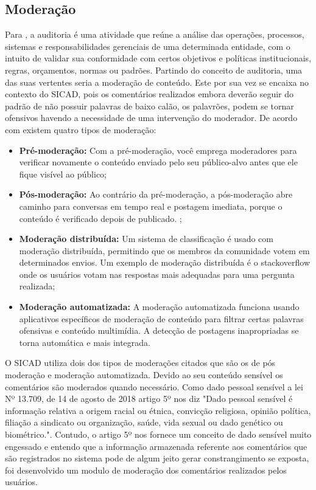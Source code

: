 \documentclass[12pt, a4paper]{report}
\begin{document}
\subsection{Moderação}
Para \citep{netosolanca2007}, a auditoria é uma atividade que reúne a análise das operações, processos, sistemas e responsabilidades gerenciais de uma determinada entidade, com o intuito de validar sua conformidade com certos objetivos e políticas institucionais, regras, orçamentos, normas ou padrões.
Partindo do conceito de auditoria, uma das suas vertentes seria a moderação de conteúdo. Este por sua vez se encaixa no contexto do SICAD, pois os comentários realizados embora deverão seguir do padrão de não possuir palavras de baixo calão, os palavrões, podem se tornar ofensivos havendo a necessidade de uma intervenção do moderador.
De acordo com \cite{SMITH2019} existem quatro tipos de moderação:
\begin{itemize}
\item \textbf {Pré-moderação: }Com a pré-moderação, você emprega moderadores para verificar novamente o conteúdo enviado pelo seu público-alvo antes que ele fique visível ao público; 
\item \textbf {Pós-moderação: }Ao contrário da pré-moderação, a pós-moderação abre caminho para conversas em tempo real e postagem imediata, porque o conteúdo é verificado depois de publicado. ;
\item \textbf {Moderação distribuída: }Um sistema de classificação é usado com moderação distribuída, permitindo que os membros da comunidade votem em determinados envios. Um exemplo de moderação distribuída é o stackoverflow onde os usuários votam nas respostas mais adequadas para uma pergunta realizada;
\item \textbf {Moderação automatizada: }A moderação automatizada funciona usando aplicativos específicos de moderação de conteúdo para filtrar certas palavras ofensivas e conteúdo multimídia. A detecção de postagens inapropriadas se torna automática e mais integrada. 
\end{itemize}

O SICAD utiliza dois dos tipos de moderações citados que são os de pós moderação e moderação automatizada. Devido ao seu conteúdo sensível os comentários são moderados quando necessário. Como dado pessoal sensível a lei Nº 13.709, de 14 de agosto de 2018 artigo 5º nos diz "Dado pessoal sensível é informação relativa a origem racial ou étnica, convicção religiosa, opinião política, filiação a sindicato ou organização, saúde, vida sexual ou dado genético ou biométrico.".  Contudo, o artigo 5º nos fornece um conceito de dado sensível muito engessado e entendo que a informação armazenada referente aos comentários que são registrados no sistema pode de algum jeito gerar constrangimento se exposta, foi desenvolvido um modulo de moderação dos comentários realizados pelos usuários.
\end{document}

